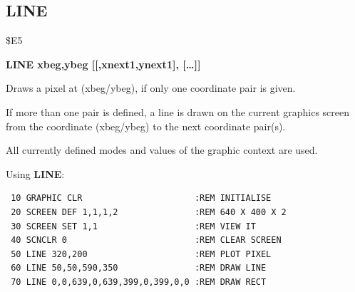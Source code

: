 
\newpage
\subsection{LINE}
\begin{description}[leftmargin=2cm,style=nextline]
\item [Token:] \$E5
\item [Format:] {\bf LINE xbeg,ybeg [[,xnext1,ynext1], [\dots]] }
\item [Usage:] Draws a pixel at (xbeg/ybeg), if only one
               coordinate pair is given.

               If more than one pair is defined, a line is
               drawn on the current graphics screen from the
               coordinate (xbeg/ybeg) to the next coordinate
               pair(s).

               All currently defined modes and values of the graphic
               context are used.

\item [Example:] Using {\bf LINE}:
\begin{tcolorbox}[colback=black,coltext=white]
\verbatimfont{\codefont}
\begin{verbatim}
 10 GRAPHIC CLR                      :REM INITIALISE
 20 SCREEN DEF 1,1,1,2               :REM 640 X 400 X 2
 30 SCREEN SET 1,1                   :REM VIEW IT
 40 SCNCLR 0                         :REM CLEAR SCREEN
 50 LINE 320,200                     :REM PLOT PIXEL
 60 LINE 50,50,590,350               :REM DRAW LINE
 70 LINE 0,0,639,0,639,399,0,399,0,0 :REM DRAW RECT
\end{verbatim}
\end{tcolorbox}
\end{description}


\newpage
